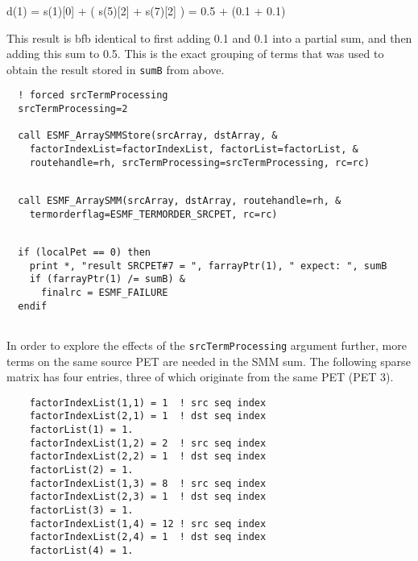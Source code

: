        d(1) = s(1)[0] + ( s(5)[2] + s(7)[2] ) = 0.5 + (0.1 + 0.1)
  
   This result is bfb identical to first adding 0.1 and 0.1 into a partial sum,
   and then adding this sum to 0.5. This is the exact grouping of
   terms that was used to obtain the result stored in {\tt sumB} from above. 

 \begin{verbatim}
  ! forced srcTermProcessing
  srcTermProcessing=2
  
  call ESMF_ArraySMMStore(srcArray, dstArray, &
    factorIndexList=factorIndexList, factorList=factorList, &
    routehandle=rh, srcTermProcessing=srcTermProcessing, rc=rc)
 
\end{verbatim}
 

 \begin{verbatim}
  call ESMF_ArraySMM(srcArray, dstArray, routehandle=rh, &
    termorderflag=ESMF_TERMORDER_SRCPET, rc=rc)
 
\end{verbatim}
 

 \begin{verbatim}
  if (localPet == 0) then
    print *, "result SRCPET#7 = ", farrayPtr(1), " expect: ", sumB
    if (farrayPtr(1) /= sumB) &
      finalrc = ESMF_FAILURE
  endif
 
\end{verbatim}
 

   In order to explore the effects of the {\tt srcTermProcessing} argument
   further, more terms on the same source PET are needed in the SMM sum.
   The following sparse matrix has four entries, three of which originate from
   the same PET (PET 3). 

 \begin{verbatim}
    factorIndexList(1,1) = 1  ! src seq index
    factorIndexList(2,1) = 1  ! dst seq index
    factorList(1) = 1.
    factorIndexList(1,2) = 2  ! src seq index
    factorIndexList(2,2) = 1  ! dst seq index
    factorList(2) = 1.
    factorIndexList(1,3) = 8  ! src seq index
    factorIndexList(2,3) = 1  ! dst seq index
    factorList(3) = 1.
    factorIndexList(1,4) = 12 ! src seq index
    factorIndexList(2,4) = 1  ! dst seq index
    factorList(4) = 1.
 
\end{verbatim}
 
